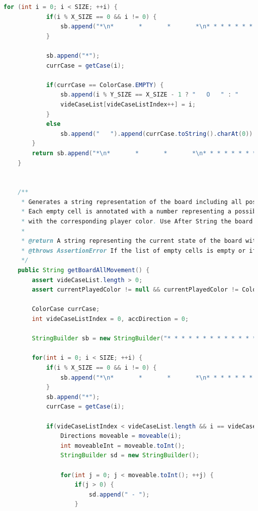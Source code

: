 \documentclass[a4paper,11pt]{article}
\begin{document}
\begin{lstlisting}[language=Java, breaklines=true]
        for (int i = 0; i < SIZE; ++i) {
            if(i % X_SIZE == 0 && i != 0) {
                sb.append("*\n*       *       *       *\n* * * * * * * * * * * * *\n*       *       *       *\n");
            }

            sb.append("*");
            currCase = getCase(i);

            if(currCase == ColorCase.EMPTY) {
                sb.append(i % Y_SIZE == X_SIZE - 1 ? "   O   " : "       ");
                videCaseList[videCaseListIndex++] = i;
            }
            else 
                sb.append("   ").append(currCase.toString().charAt(0)).append("   ");
        }
        return sb.append("*\n*       *       *       *\n* * * * * * * * * * * * *\n").toString();
    }


    /**
     * Generates a string representation of the board including all possible movements for the current player.
     * Each empty cell is annotated with a number representing a possible movement, and occupied cells are labeled
     * with the corresponding player color. Use After String the board !
     *
     * @return A string representing the current state of the board with all possible movements annotated.
     * @throws AssertionError If the list of empty cells is empty or if the current played color is null or empty.
     */
    public String getBoardAllMovement() {
        assert videCaseList.length > 0;
        assert currentPlayedColor != null && currentPlayedColor != ColorCase.EMPTY;
        
        ColorCase currCase;
        int videCaseListIndex = 0, accDirection = 0;

        StringBuilder sb = new StringBuilder("* * * * * * * * * * * * *\n*       *       *       *\n");

        for(int i = 0; i < SIZE; ++i) {
            if(i % X_SIZE == 0 && i != 0) {
                sb.append("*\n*       *       *       *\n* * * * * * * * * * * * *\n*       *       *       *\n");
            }
            sb.append("*");
            currCase = getCase(i);

            if(videCaseListIndex < videCaseList.length && i == videCaseList[videCaseListIndex] || currCase == currentPlayedColor) {
                Directions moveable = moveable(i);
                int moveableInt = moveable.toInt();
                StringBuilder sd = new StringBuilder();
                
                for(int j = 0; j < moveable.toInt(); ++j) {
                    if(j > 0) {
                        sd.append(" - ");
                    }


\end{lstlisting}
\end{document}
